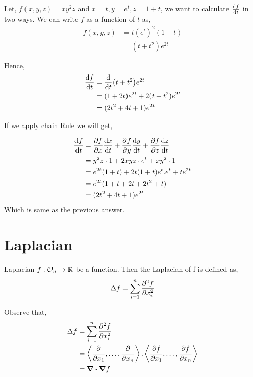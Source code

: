 \documentclass[../Analysis-3]{subfiles}
\begin{document}
\begin{Eg}{}{}
    Let, $f(x,y,z) = xy^{2}z$ and $x=t, y=e^t, z= 1+t$, we want to calculate $\dv{f}{t}$ in two ways. We can write $f$ as a function of $t$ as,
    \begin{align*}
        f(x,y,z) & = t(e^t)^2(1+t) \\
                 & = (t+t^2)e^{2t}
    \end{align*}

    Hence, \begin{align*}
        \dv{f}{t} & = \dv{t}(t+t^2)e^{2t}           \\
                  & = (1+2t)e^{2t} + 2(t+t^2)e^{2t} \\
                  & = (2t^2+4t+1)e^{2t}
    \end{align*}

 If we apply chain Rule we will get,
    
    \begin{align*}
        \dv{f}{t} & = \pdv{f}{x} \dv{x}{t} + \pdv{f}{y} \dv{y}{t} + \pdv{f}{z} \dv{z}{t} \\
              & = y^2z\cdot 1 + 2xyz\cdot e^t + xy^2\cdot 1                          \\
              & = e^{2t}(1+t) + 2t(1+t)e^t.e^t + te^{2t}                             \\
              & = e^{2t}(1+t+2t+2t^2+t)                                              \\
              & = (2t^2+4t+1)e^{2t}
    \end{align*}
    Which is same as the previous answer.
\end{Eg}


\section{Laplacian}

\begin{Def}{Laplacian}{}
    $f : \mathcal{O}_{n} \to \mathbb{R}$ be a function. Then the Laplacian of f is defined as, \[ \Delta f = \sum_{i = 1}^{n} \pdv[2]{f}{x_i}   \]
\end{Def}

Observe that,  \begin{align*}
    \Delta f & = \sum_{i=1}^{n} \pdv[2]{f}{x_i}                                                                                               \\
             & = \left\langle \pdv{}{x_1}, \ldots, \pdv{}{x_n}  \right\rangle. \left\langle \pdv{f}{x_1}, \ldots, \pdv{f}{x_n}  \right\rangle \\
             & = \div\grad f
\end{align*}
\end{document}
